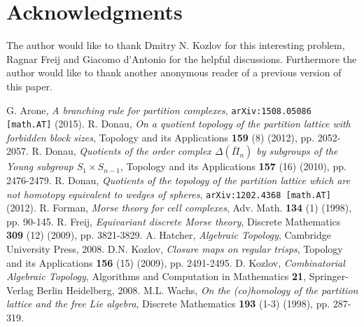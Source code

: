 \documentclass{elsarticle}
\begin{document}
\section*{Acknowledgments}
The author would like to thank Dmitry N. Kozlov for this interesting problem, Ragnar Freij and Giacomo d'Antonio for the helpful discussions. Furthermore the author would like to thank another anonymous reader of a previous version of this paper.

\begin{thebibliography}{00}
G. Arone, \textit{A branching rule for partition complexes}, \texttt{arXiv:1508.05086 [math.AT]} (2015).
R. Donau, \textit{On a quotient topology of the partition lattice with forbidden block sizes}, Topology and its Applications \textbf{159} (8) (2012), pp. 2052-2057.
R. Donau, \textit{Quotients of the order complex $\Delta(\overline{\Pi}_n)$ by subgroups of the Young subgroup $S_1\times S_{n-1}$}, Topology and its Applications \textbf{157} (16) (2010), pp. 2476-2479.
R. Donau, \textit{Quotients of the topology of the partition lattice which are not homotopy equivalent to wedges of spheres}, \texttt{arXiv:1202.4368 [math.AT]} (2012).
R. Forman, \textit{Morse theory for cell complexes}, Adv. Math. \textbf{134} (1) (1998), pp. 90-145.
R. Freij, \textit{Equivariant discrete Morse theory}, Discrete Mathematics \textbf{309} (12) (2009), pp. 3821-3829.
A. Hatcher, \textit{Algebraic Topology}, Cambridge University Press, 2008.
D.N. Kozlov, \textit{Closure maps on regular trisps}, Topology and its Applications \textbf{156} (15) (2009), pp. 2491-2495.
D. Kozlov, \textit{Combinatorial Algebraic Topology}, Algorithms and Computation in Mathematics \textbf{21}, Springer-Verlag Berlin Heidelberg, 2008.
M.L. Wachs, \textit{On the (co)homology of the partition lattice and the free Lie algebra}, Discrete Mathematics \textbf{193} (1-3) (1998), pp. 287-319.
\end{thebibliography}
\end{document}
